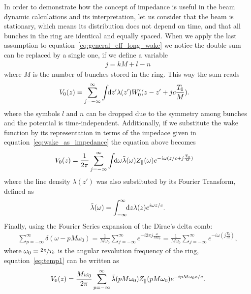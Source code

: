     In order to demonstrate how the concept of impedance is useful in the beam dynamic calculations and its interpretation, let us consider that the beam is stationary, which means its distribution does not depend on time, and that all bunches in the ring are identical and equally spaced. When we apply the last assumption to equation~\eqref{eq:general_eff_long_wake} we notice the double sum can be replaced by a single one, if we define a variable
    \begin{align*}
    	  j = kM + l - n
    \end{align*}
    where $M$ is the number of bunches stored in the ring. This way the sum reads
    \begin{align}
	  	V_0(z) = \sum_{j=-\infty}^\infty\int\!\!\text{d}z' 
				&\lambda(z')W'_0(z-z' + jc\frac{T_0}{M}).
    \end{align}
    where the symbols $l$ and $n$ can be dropped due to the symmetry among bunches and the potential is time-independent. Additionally, if we substitute the wake function by its representation in terms of the impedace given in equation~\eqref{eq:wake_as_impedance} the equation above becomes
    \begin{align}\label{eq:temp1}
	   	V_0(z) = \frac{1}{2\pi}\sum_{j=-\infty}^\infty\int\!\!\text{d}\omega 
 				&\tilde{\lambda}(\omega)Z_\parallel(\omega)e^{-i\omega(z/c + j\frac{T_0}{M})}
    \end{align}
    where the line density $\lambda(z')$ was also substituted by its Fourier  Transform, defined as
    \begin{align}
  		\tilde{\lambda}(\omega) = \int_{-\infty}^{\infty}\!\!\text{d}z \lambda(z)e^{i\omega z/c}.
    \end{align}
    Finally, using the Fourier Series expansion of the Dirac's delta comb:
    \begin{align}
  	  	\sum_{p=-\infty}^\infty \delta(\omega-pM\omega_0) =
	    	\frac{1}{M\omega_0} \sum_{j=-\infty}^\infty e^{-i2\pi j\frac{\omega}{M\omega_0}} =
	    	\frac{1}{M\omega_0} \sum_{j=-\infty}^\infty e^{-i\omega(j\frac{T_0}{M})},
    \end{align}
    where $\omega_0 = \sfrac{2\pi}{T_0}$ is the angular revolution frequency of the ring, equation~\eqref{eq:temp1} can be written as
    \begin{align}\label{eq:impedance_interpretation_long}
	  	V_0(z) = \frac{M\omega_0}{2\pi} \sum_{p=-\infty}^\infty \tilde{\lambda}(pM\omega_0)Z_\parallel(pM\omega_0)e^{-ipM\omega_0 z/c}.
    \end{align}
